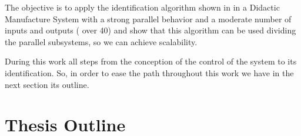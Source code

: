 The objective is to apply the identification algorithm shown in
\cite{moreira2018enhanced} in a Didactic Manufacture
System with a strong parallel behavior and a moderate number of inputs and
outputs ( over 40) and show that this algorithm can be used
dividing the parallel subsystems, so we can achieve scalability. 


During this work all steps from the conception of the control of the system to
its identification. So, in order to ease the path throughout this work we have
in the next section its outline.

\section{Thesis Outline}
\label{sec:thesisOutline}






